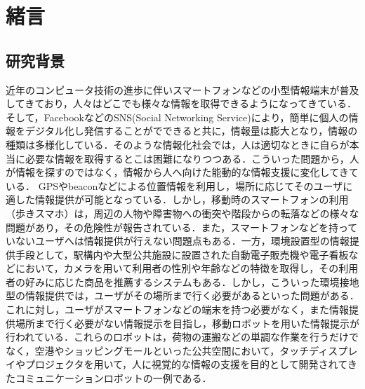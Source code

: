 \documentclass[12pt]{sonota/aislab}
\begin{document}
\clearpage
{}
\bgroup

\tableofcontents
\clearpage
{}
\listoffigures 
\clearpage
{}
\listoftables

\egroup

\mainmatter

\chapter{緒言}\label{chap:introduction}

\section{研究背景}
近年のコンピュータ技術の進歩に伴いスマートフォンなどの小型情報端末が普及してきており，人々はどこでも様々な情報を取得できるようになってきている．そして，FacebookなどのSNS(Social Networking Service)により，簡単に個人の情報をデジタル化し発信することがでできると共に，情報量は膨大となり，情報の種類は多様化している．そのような情報化社会では，人は適切なときに自らが本当に必要な情報を取得するとこは困難になりつつある．こういった問題から，人が情報を探すのではなく，情報から人へ向けた能動的な情報支援に変化してきている．
GPSやbeaconなどによる位置情報を利用し，場所に応じてそのユーザに適した情報提供が可能となっている．しかし，移動時のスマートフォンの利用（歩きスマホ）は，周辺の人物や障害物への衝突や階段からの転落などの様々な問題があり，その危険性が報告されている\cite{aruki}．また，スマートフォンなどを持っていないユーザへは情報提供が行えない問題点もある．一方，環境設置型の情報提供手段として，駅構内や大型公共施設に設置された自動電子販売機や電子看板などにおいて，カメラを用いて利用者の性別や年齢などの特徴を取得し，その利用者の好みに応じた商品を推薦するシステムもある．しかし，こういった環境接地型の情報提供では，ユーザがその場所まで行く必要があるといった問題がある．
\\ \indent
これに対し，ユーザがスマートフォンなどの端末を持つ必要がなく，また情報提供場所まで行く必要がない情報提示を目指し，移動ロボットを用いた情報提示が行われている\cite{spencr}\cite{UD}．これらのロボットは，荷物の運搬などの単調な作業を行うだけでなく，空港やショッピングモールといった公共空間において，タッチディスプレイやプロジェクタを用いて，人に視覚的な情報の支援を目的として開発されてきたコミュニケーションロボットの一例である．
\end{document}
